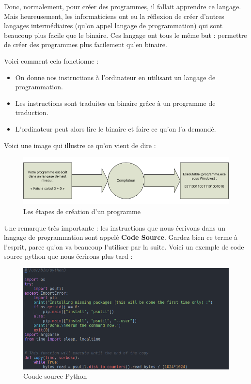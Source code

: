 \documentclass[12pt]{article}
\begin{document}
            Donc, normalement, pour créer des programmes, il fallait apprendre ce langage.
            Mais heureusement, les informaticiens ont eu la réflexion de créer d'autres langages intermédiaires 
            (qu'on appel langage de programmation) qui sont beaucoup plus facile que le binaire. Ces langage ont 
            tous le même but : permettre de créer des programmes plus facilement qu'en binaire.
            
            Voici comment cela fonctionne :
            \begin{itemize}
                \item On donne nos instructions à l'ordinateur en utilisant un langage de programmation.
                \item Les instructions sont traduites en binaire grâce à un programme de traduction.
                \item L'ordinateur peut alors lire le binaire et faire ce qu'on l'a demandé.
            \end{itemize}

            Voici une image qui illustre ce qu'on vient de dire :
            \begin{figure}[H]
                \centering
                \includegraphics[width=\linewidth]{img/11_compilation.png}
                \caption{Les étapes de création d'un programme}
            \end{figure}

            Une remarque très importante : les instructions que nous écrivons dans un langage de programmation 
            sont appelé \textbf{Code Source}. Gardez bien ce terme à l'esprit, parce qu'on va beaucoup l'utiliser 
            par la suite. Voici un exemple de code source python que nous écrirons plus tard :
            
            \begin{figure}[H]
                \centering
                \includegraphics[width=\linewidth]{img/12_code.png}
                \caption{Coude source Python}
            \end{figure}
\end{document}
